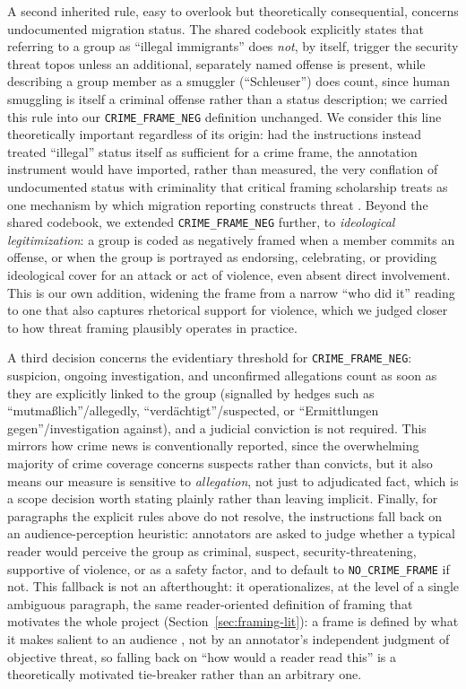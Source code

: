 \documentclass[a4paper,oneside,bibliography=totoc]{scrartcl}
\begin{document}
A second inherited rule, easy to overlook but theoretically consequential, concerns undocumented migration status. The shared codebook \citep{freudenthalercodebook} explicitly states that referring to a group as \enquote{illegal immigrants} does \emph{not}, by itself, trigger the security threat topos unless an additional, separately named offense is present, while describing a group member as a smuggler (\enquote{Schleuser}) does count, since human smuggling is itself a criminal offense rather than a status description; we carried this rule into our \texttt{CRIME\_FRAME\_NEG} definition unchanged. We consider this line theoretically important regardless of its origin: had the instructions instead treated \enquote{illegal} status itself as sufficient for a crime frame, the annotation instrument would have imported, rather than measured, the very conflation of undocumented status with criminality that critical framing scholarship treats as one mechanism by which migration reporting constructs threat \citep{eberl2018}. Beyond the shared codebook, we extended \texttt{CRIME\_FRAME\_NEG} further, to \emph{ideological legitimization}: a group is coded as negatively framed when a member commits an offense, or when the group is portrayed as endorsing, celebrating, or providing ideological cover for an attack or act of violence, even absent direct involvement. This is our own addition, widening the frame from a narrow \enquote{who did it} reading to one that also captures rhetorical support for violence, which we judged closer to how threat framing plausibly operates in practice.

A third decision concerns the evidentiary threshold for \texttt{CRIME\_FRAME\_NEG}: suspicion, ongoing investigation, and unconfirmed allegations count as soon as they are explicitly linked to the group (signalled by hedges such as \enquote{mutmaßlich}/allegedly, \enquote{verdächtigt}/suspected, or \enquote{Ermittlungen gegen}/investigation against), and a judicial conviction is not required. This mirrors how crime news is conventionally reported, since the overwhelming majority of crime coverage concerns suspects rather than convicts, but it also means our measure is sensitive to \emph{allegation}, not just to adjudicated fact, which is a scope decision worth stating plainly rather than leaving implicit. Finally, for paragraphs the explicit rules above do not resolve, the instructions fall back on an audience-perception heuristic: annotators are asked to judge whether a typical reader would perceive the group as criminal, suspect, security-threatening, supportive of violence, or as a safety factor, and to default to \texttt{NO\_CRIME\_FRAME} if not. This fallback is not an afterthought: it operationalizes, at the level of a single ambiguous paragraph, the same reader-oriented definition of framing that motivates the whole project (Section~\ref{sec:framing-lit}): a frame is defined by what it makes salient to an audience \citep{entman1993}, not by an annotator's independent judgment of objective threat, so falling back on \enquote{how would a reader read this} is a theoretically motivated tie-breaker rather than an arbitrary one.
\end{document}
